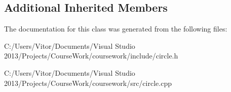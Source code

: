 \subsection*{Additional Inherited Members}


The documentation for this class was generated from the following files\+:\begin{DoxyCompactItemize}
\item 
C\+:/\+Users/\+Vitor/\+Documents/\+Visual Studio 2013/\+Projects/\+Course\+Work/coursework/include/circle.\+h\item 
C\+:/\+Users/\+Vitor/\+Documents/\+Visual Studio 2013/\+Projects/\+Course\+Work/coursework/src/circle.\+cpp\end{DoxyCompactItemize}
